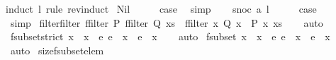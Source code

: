 \begin{isabellebody}
%
\isadelimproof
%
\endisadelimproof
%
\isatagproof
{}\isamarkupfalse%
{\isacharparenleft}induct\ l\ rule{\isacharcolon}\ rev{\isacharunderscore}induct{\isacharparenright}\isanewline
{}\isamarkupfalse%
\ Nil\isanewline
\ \ \isamarkupfalse%
\ \isamarkupfalse%
\ {\isacharquery}case\ \isamarkupfalse%
\ simp\isanewline
{}\isamarkupfalse%
\isanewline
\ \ \isamarkupfalse%
\ {\isacharparenleft}snoc\ a\ l{\isacharparenright}\isanewline
\ \ \isamarkupfalse%
\ \isamarkupfalse%
\ {\isacharquery}case\isanewline
\ \ \ \ \isamarkupfalse%
\ simp\isanewline
{}\isamarkupfalse%
%
\endisatagproof
{\isafoldproof}%
%
\isadelimproof
\isanewline
%
\endisadelimproof
\isanewline
{}\isamarkupfalse%
\ filter{\isacharunderscore}filter{\isacharcolon}\ {\isachardoublequoteopen}ffilter\ P\ {\isacharparenleft}ffilter\ Q\ xs{\isacharparenright}\ {\isacharequal}\ ffilter\ {\isacharparenleft}{\isasymlambda}x{\isachardot}\ Q\ x\ {\isasymand}\ P\ x{\isacharparenright}\ xs{\isachardoublequoteclose}\isanewline
%
\isadelimproof
\ \ %
\endisadelimproof
%
\isatagproof
{}\isamarkupfalse%
\ auto%
\endisatagproof
{\isafoldproof}%
%
\isadelimproof
\isanewline
%
\endisadelimproof
\isanewline
{}\isamarkupfalse%
\ fsubset{\isacharunderscore}strict{\isacharcolon}\ {\isachardoublequoteopen}x{}\ {\isacharbar}{\isasymsubset}{\isacharbar}\ x{}\ {\isasymLongrightarrow}\ {\isasymexists}e{\isachardot}\ e\ {\isacharbar}{\isasymin}{\isacharbar}\ x{}\ {\isasymand}\ e\ {\isacharbar}{\isasymnotin}{\isacharbar}\ x{}{\isachardoublequoteclose}\isanewline
%
\isadelimproof
\ \ %
\endisadelimproof
%
\isatagproof
{}\isamarkupfalse%
\ auto%
\endisatagproof
{\isafoldproof}%
%
\isadelimproof
\isanewline
%
\endisadelimproof
\isanewline
{}\isamarkupfalse%
\ fsubset{\isacharcolon}\ {\isachardoublequoteopen}x{}\ {\isacharbar}{\isasymsubset}{\isacharbar}\ x{}\ {\isasymLongrightarrow}\ {\isasymnexists}e{\isachardot}\ e\ {\isacharbar}{\isasymin}{\isacharbar}\ x{}\ {\isasymand}\ e\ {\isacharbar}{\isasymnotin}{\isacharbar}\ x{}{\isachardoublequoteclose}\isanewline
%
\isadelimproof
\ \ %
\endisadelimproof
%
\isatagproof
{}\isamarkupfalse%
\ auto%
\endisatagproof
{\isafoldproof}%
%
\isadelimproof
\isanewline
%
\endisadelimproof
\isanewline
{}\isamarkupfalse%
\ size{\isacharunderscore}fsubset{\isacharunderscore}elem{\isacharcolon}\ \isanewline

\end{isabellebody}
